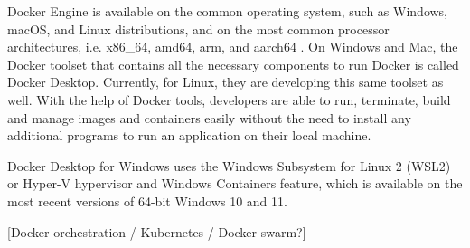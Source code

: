 \documentclass[fleqn,12pt]{olplainarticle}
\begin{document}
Docker Engine is available on the common operating system, such as Windows, macOS, and Linux distributions, and on the most common processor architectures, i.e. x86\_64, amd64, arm, and aarch64 \cite{docker:install}.  On Windows and Mac, the Docker toolset that contains all the necessary components to run Docker is called Docker Desktop. Currently, for Linux, they are developing this same toolset as well. With the help of Docker tools, developers are able to run, terminate, build and manage images and containers easily without the need to install any additional programs to run an application on their local machine.

Docker Desktop for Windows uses the Windows Subsystem for Linux 2 (WSL2) or Hyper-V hypervisor and Windows Containers feature, which is available on the most recent versions of 64-bit Windows 10 and 11\cite{docker:windows}.

[Docker orchestration / Kubernetes / Docker swarm?]


\end{document}
